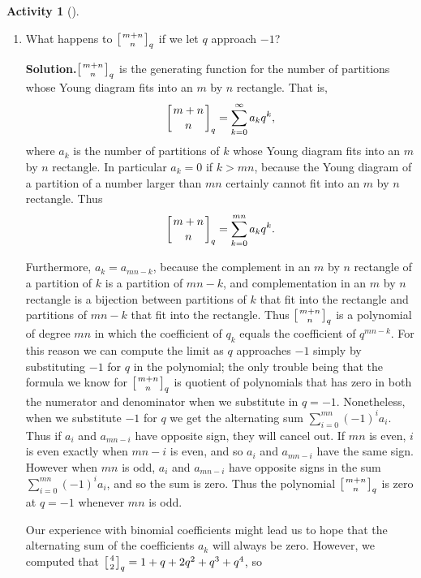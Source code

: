 \documentclass[10pt,]{book}
\theoremstyle{plain}
\theoremstyle{definition}
\newtheorem{activity}[project]{Activity}
\numberwithin{equation}{chapter}
\newcommand{\qchoose}[2]{\left[{#1\atop#2}\right]_q}
\begin{document}
\begin{activity}[]
\begin{enumerate}[label=(\alph*)]
~\par
\item What happens to \(\qchoose{m+n}{n}\) if we let \(q\) approach \(-1\)?%
\par\medskip\noindent%
\textbf{Solution.}\quad \(\qchoose{m+n}{n}\) is the generating function for the number of partitions whose Young diagram fits into an \(m\) by \(n\) rectangle. That is,%
\begin{equation*}
\qchoose{m+n}{n}=\sum_{k=0}^\infty a_kq^k,
\end{equation*}
where \(a_k\) is the number of partitions of \(k\) whose Young diagram fits into an \(m\) by \(n\) rectangle. In particular \(a_k=0\) if \(k>mn\), because the Young diagram of a partition of a number larger than \(mn\) certainly cannot fit into an \(m\) by \(n\) rectangle. Thus%
\begin{equation*}
\qchoose{m+n}{n}=\sum_{k=0}^{mn} a_kq^k.
\end{equation*}
%
\par
Furthermore, \(a_k=a_{mn-k}\), because the complement in an \(m\) by \(n\) rectangle of a partition of \(k\) is a partition of \(mn-k\), and complementation in an \(m\) by \(n\) rectangle is a bijection between partitions of \(k\) that fit into the rectangle and partitions of \(mn-k\) that fit into the rectangle. Thus \(\qchoose{m+n}{n}\) is a polynomial of degree \(mn\) in which the coefficient of \(q_k\) equals the coefficient of \(q^{mn-k}\). For this reason we can compute the limit as \(q\) approaches \(-1\) simply by substituting \(-1\) for \(q\) in the polynomial; the only trouble being that the formula we know for \(\qchoose{m+n}{n}\) is quotient of polynomials that has zero in both the numerator and denominator when we substitute in \(q=-1\). Nonetheless, when we substitute \(-1\) for \(q\) we get the alternating sum \(\sum_{i=0}^{mn} (-1)^ia_i\).  Thus if \(a_i\) and \(a_{mn-i}\) have opposite sign, they will cancel out. If \(mn\) is even, \(i\) is even exactly when \(mn-i\) is even, and so \(a_i\) and \(a_{mn-i}\) have the same sign. However when \(mn\) is odd, \(a_i\) and \(a_{mn-i}\) have opposite signs in the sum \(\sum_{i=0}^{mn} (-1)^ia_i\), and so the sum is zero.  Thus the polynomial \(\qchoose{m+n}{n}\) is zero at \(q=-1\) whenever \(mn\) is odd.%
\par
Our experience with binomial coefficients might lead us to hope that the alternating sum of the coefficients \(a_k\) will always be zero. However, we computed that \(\qchoose{4}{2}=1+q+2q^2+q^3+q^4\), so%
\begin{equation*}

\end{equation*}
\end{enumerate}
\end{activity}
\end{document}
